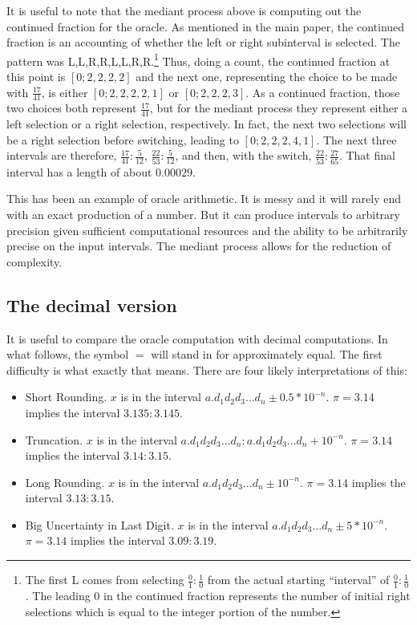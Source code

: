 \documentclass[12pt]{article}
\begin{document}
It is useful to note that the mediant process above is computing out the continued fraction for the oracle. As mentioned in the main paper, the continued fraction is an accounting of whether the left or right subinterval is selected. The pattern was L,L,R,R,L,L,R,R.\footnote{The first L comes from selecting $\frac{0}{1}: \frac{1}{0}$ from the actual starting ``interval'' of $\frac{0}{1}: \frac{1}{0}$. The leading 0 in the continued fraction represents the number of initial right selections which is equal to the integer portion of the number.} Thus, doing a count, the continued fraction at this point is $[0;2,2,2,2]$ and the next one, representing the choice to be made with $\frac{17}{41}$, is either $[0;2,2,2,2,1]$ or $[0;2,2,2,3]$. As a continued fraction, those two choices both represent $\frac{17}{41}$, but for the mediant process they represent either a left selection or a right selection, respectively. In fact, the next two selections will be a right selection before switching, leading to $[0;2,2,2,4,1]$. The next three intervals are therefore, $\frac{17}{41}: \frac{5}{12}$, $\frac{22}{53}: \frac{5}{12}$, and then, with the switch, $\frac{22}{53}: \frac{27}{65}$. That final interval has a length of about $0.00029$. 

This has been an example of oracle arithmetic. It is messy and it will rarely end with an exact production of a number. But it can produce intervals to arbitrary precision given sufficient computational resources and the ability to be arbitrarily precise on the input intervals. The mediant process allows for the reduction of complexity. 

\subsection{The decimal version}

It is useful to compare the oracle computation with decimal computations. In what follows, the symbol $=$ will stand in for approximately equal. The first difficulty is what exactly that means. There are four likely interpretations of this:

\begin{itemize}
\item Short Rounding. $x$ is in the interval $a.d_1d_2d_3\ldots d_n \pm 0.5*10^{-n}$. $\pi = 3.14$ implies the interval $3.135:3.145$.
\item Truncation. $x$ is in the interval $a.d_1d_2d_3\ldots d_n: a.d_1d_2d_3\ldots d_n +10^{-n}$. $\pi=3.14$ implies the interval $3.14:3.15$.
\item Long Rounding. $x$ is in the interval $a.d_1d_2d_3\ldots d_n \pm 10^{-n}$. $\pi = 3.14$ implies the interval $3.13:3.15$. 
\item Big Uncertainty in Last Digit. $x$ is in the interval $a.d_1d_2d_3\ldots d_n \pm 5*10^{-n}$. $\pi = 3.14$ implies the interval $3.09:3.19$. 
\end{itemize}
\end{document}

